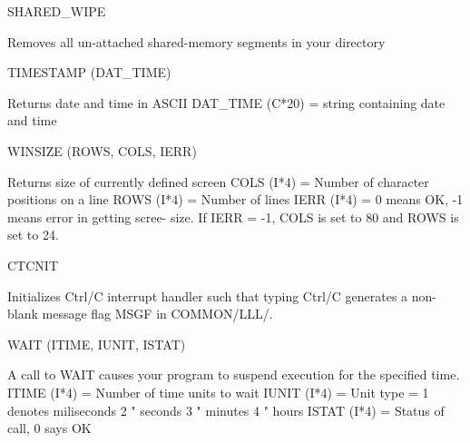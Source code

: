  
   SHARED_WIPE
 
                       Removes all un-attached shared-memory segments in your
                       directory
 
 
   TIMESTAMP          (DAT_TIME)
 
                       Returns date and time in ASCII
                       DAT_TIME (C*20) = string containing date and time
 
 
   WINSIZE            (ROWS, COLS, IERR)
 
                       Returns size of currently defined screen
                       COLS (I*4) = Number of character positions on a line
                       ROWS (I*4) = Number of lines
                       IERR (I*4) = 0 means OK, -1 means error in getting
                                     scree- size.  If IERR = -1, COLS is set
                                     to 80 and ROWS is set to 24.
 
 
   CTCNIT
 
                       Initializes Ctrl/C interrupt handler such that typing
                       Ctrl/C generates a non-blank message flag MSGF
                       in COMMON/LLL/.
 
 
   WAIT               (ITIME, IUNIT, ISTAT)
 
                       A call to WAIT causes your program to suspend execution
                       for the specified time.
                       ITIME (I*4) = Number of time units to wait
                       IUNIT (I*4) = Unit type = 1 denotes miliseconds
                                                 2    "    seconds
                                                 3    "    minutes
                                                 4    "    hours
                       ISTAT (I*4) = Status of call, 0 says OK
